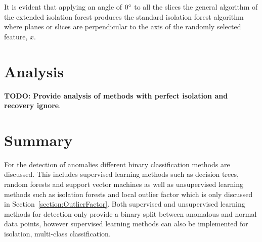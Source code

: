 It is evident that applying an angle of $0\degree$ to all the slices the general algorithm of the extended isolation forest produces the standard isolation forest algorithm where planes or slices are perpendicular to the axis of the randomly selected feature, $x$.

\section{Analysis}
\textbf{TODO: Provide analysis of methods with perfect isolation and recovery ignore}.

\section{Summary}
For the detection of anomalies different binary classification methods are discussed. This includes supervised learning methods such as decision trees, random forests and support vector machines as well as unsupervised learning methods such as isolation forests and local outlier factor which is only discussed in Section~\ref{section:OutlierFactor}. Both supervised and unsupervised learning methods for detection only provide a binary split between anomalous and normal data points, however supervised learning methods can also be implemented for isolation, multi-class classification.